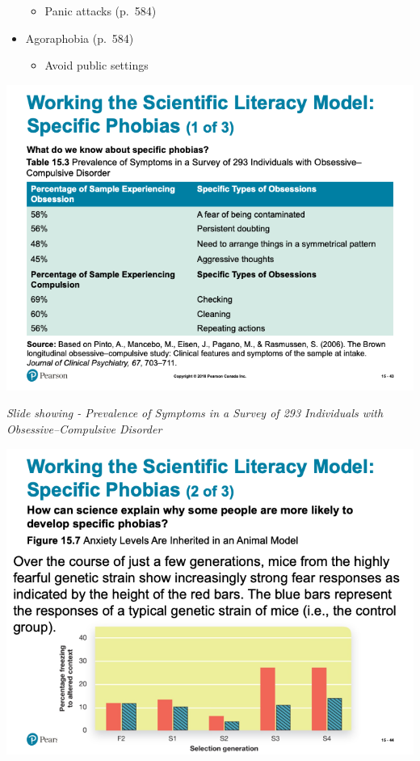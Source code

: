 \documentclass[
]{book}
\providecommand{\tightlist}{%
  \setlength{\itemsep}{0pt}\setlength{\parskip}{0pt}}
\begin{document}
\begin{reflect}
\begin{itemize}
  \begin{itemize}
  \tightlist
  \item
    Panic attacks (p.~584)\\
  \end{itemize}
\item
  Agoraphobia (p.~584)

  \begin{itemize}
  \tightlist
  \item
    Avoid public settings
  \end{itemize}
\end{itemize}

\includegraphics{assets/unit_10/slide_43.png}

\emph{Slide showing - Prevalence of Symptoms in a Survey of 293 Individuals with Obsessive--Compulsive Disorder}

\includegraphics{assets/unit_10/slide_44.png}


\end{reflect}
\end{document}
